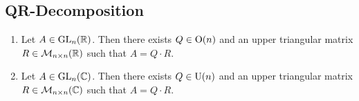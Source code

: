 \subsection*{QR-Decomposition}

\begin{theorem}
\label{thm:qr_decomposition_invertible}
\begin{enumerate}[label=\textbf{(\alph*)}]
    \item Let $A \in \operatorname{GL}_n(\mathbb{R})$. Then there exists $Q \in \operatorname{O}(n)$ and an upper triangular matrix $R \in \mathcal{M}_{n \times n}(\mathbb{R})$ such that $A = Q \cdot R$.
    \item Let $A \in \operatorname{GL}_n(\mathbb{C})$. Then there exists $Q \in \operatorname{U}(n)$ and an upper triangular matrix $R \in \mathcal{M}_{n \times n}(\mathbb{C})$ such that $A = Q \cdot R$.
\end{enumerate}
\end{theorem}

